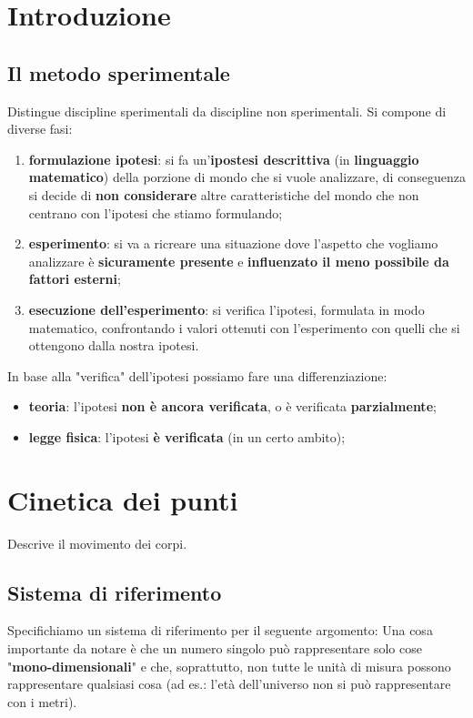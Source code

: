\section{Introduzione}
	\subsection{Il metodo sperimentale}
		Distingue discipline sperimentali da discipline non sperimentali. Si compone di diverse fasi:
		\begin{enumerate}
			\item \textbf{formulazione ipotesi}: si fa un'\textbf{ipostesi descrittiva} (in \textbf{linguaggio matematico}) della porzione di mondo che si vuole analizzare, di conseguenza si decide di \textbf{non considerare} altre caratteristiche del mondo che non centrano con l'ipotesi che stiamo formulando;
			\item \textbf{esperimento}: si va a ricreare una situazione dove l'aspetto che vogliamo analizzare è \textbf{sicuramente presente} e \textbf{influenzato il meno possibile da fattori esterni};
			\item \textbf{esecuzione dell'esperimento}: si verifica l'ipotesi, formulata in modo matematico, confrontando i valori ottenuti con l'esperimento con quelli che si ottengono dalla nostra ipotesi.
			\medskip\\
		\end{enumerate}

		In base alla "verifica" dell'ipotesi possiamo fare una differenziazione:
		\begin{itemize}
			\item \textbf{teoria}: l'ipotesi \textbf{non è ancora verificata}, o è verificata \textbf{parzialmente};
			\item \textbf{legge fisica}: l'ipotesi \textbf{è verificata} (in un certo ambito);
		\end{itemize}

\section{Cinetica dei punti}
	Descrive il movimento dei corpi.
	\subsection{Sistema di riferimento}
		Specifichiamo un sistema di riferimento per il seguente argomento:
		Una cosa importante da notare è che un numero singolo può rappresentare solo cose "\textbf{mono-dimensionali}" e che, soprattutto, non tutte le unità di misura possono rappresentare qualsiasi cosa (ad es.: l'età dell'universo non si può rappresentare con i metri).

